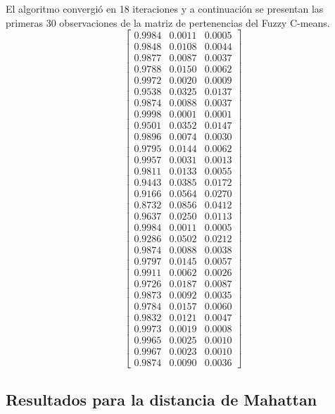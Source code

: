 \documentclass[11pt, letterpaper]{article}
\begin{document}
El algoritmo convergió  en 18 iteraciones y a continuación se presentan las primeras 30 observaciones de la matriz de pertenencias del Fuzzy C-means.
\[
\begin{bmatrix}
	0.9984 & 0.0011 & 0.0005 \\
	0.9848 & 0.0108 & 0.0044 \\
	0.9877 & 0.0087 & 0.0037 \\
	0.9788 & 0.0150 & 0.0062 \\
	0.9972 & 0.0020 & 0.0009 \\
	0.9538 & 0.0325 & 0.0137 \\
	0.9874 & 0.0088 & 0.0037 \\
	0.9998 & 0.0001 & 0.0001 \\
	0.9501 & 0.0352 & 0.0147 \\
	0.9896 & 0.0074 & 0.0030 \\
	0.9795 & 0.0144 & 0.0062 \\
	0.9957 & 0.0031 & 0.0013 \\
	0.9811 & 0.0133 & 0.0055 \\
	0.9443 & 0.0385 & 0.0172 \\
	0.9166 & 0.0564 & 0.0270 \\
	0.8732 & 0.0856 & 0.0412 \\
	0.9637 & 0.0250 & 0.0113 \\
	0.9984 & 0.0011 & 0.0005 \\
	0.9286 & 0.0502 & 0.0212 \\
	0.9874 & 0.0088 & 0.0038 \\
	0.9797 & 0.0145 & 0.0057 \\
	0.9911 & 0.0062 & 0.0026 \\
	0.9726 & 0.0187 & 0.0087 \\
	0.9873 & 0.0092 & 0.0035 \\
	0.9784 & 0.0157 & 0.0060 \\
	0.9832 & 0.0121 & 0.0047 \\
	0.9973 & 0.0019 & 0.0008 \\
	0.9965 & 0.0025 & 0.0010 \\
	0.9967 & 0.0023 & 0.0010 \\
	0.9874 & 0.0090 & 0.0036
\end{bmatrix}
\]


\newpage

\subsection{Resultados para la distancia de Mahattan}
\end{document}
